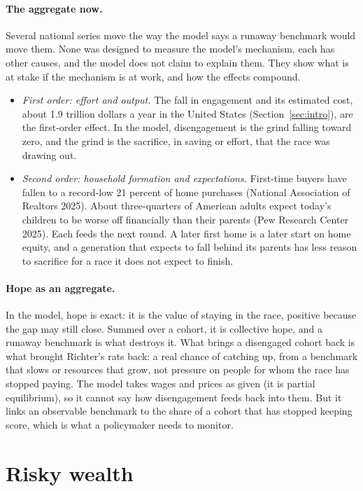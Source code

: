 \documentclass[12pt]{article}
\theoremstyle{definition}
\theoremstyle{remark}
\theoremstyle{plain}
\theoremstyle{definition}
\begin{document}
\paragraph{The aggregate now.} Several national series move the way the model says a runaway benchmark would move them. None was designed to measure the model's mechanism, each has other causes, and the model does not claim to explain them. They show what is at stake if the mechanism is at work, and how the effects compound.
\begin{itemize}
\item \emph{First order: effort and output.} The fall in engagement and its estimated cost, about 1.9 trillion dollars a year in the United States (Section~\ref{sec:intro}), are the first-order effect. In the model, disengagement is the grind falling toward zero, and the grind is the sacrifice, in saving or effort, that the race was drawing out.
\item \emph{Second order: household formation and expectations.} First-time buyers have fallen to a record-low 21 percent of home purchases (National Association of Realtors 2025). About three-quarters of American adults expect today's children to be worse off financially than their parents (Pew Research Center 2025). Each feeds the next round. A later first home is a later start on home equity, and a generation that expects to fall behind its parents has less reason to sacrifice for a race it does not expect to finish.
\end{itemize}

\paragraph{Hope as an aggregate.} In the model, hope is exact: it is the value of staying in the race, positive because the gap may still close. Summed over a cohort, it is collective hope, and a runaway benchmark is what destroys it. What brings a disengaged cohort back is what brought Richter's rats back: a real chance of catching up, from a benchmark that slows or resources that grow, not pressure on people for whom the race has stopped paying. The model takes wages and prices as given (it is partial equilibrium), so it cannot say how disengagement feeds back into them. But it links an observable benchmark to the share of a cohort that has stopped keeping score, which is what a policymaker needs to monitor.

\section{Risky wealth}\label{sec:wealth}
\end{document}
